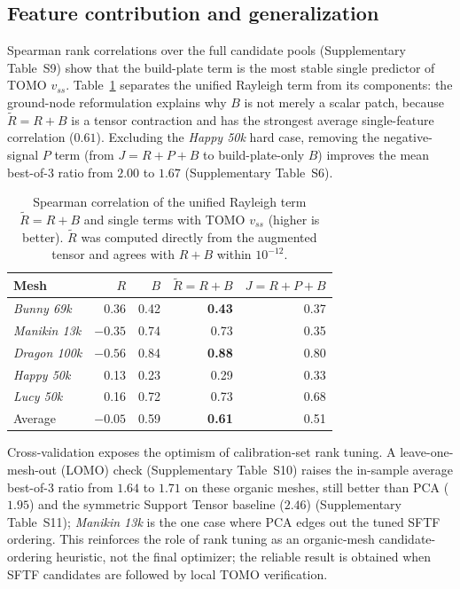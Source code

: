 \documentclass[12pt]{article}
\begin{document}
\subsection{Feature contribution and generalization}
\label{sec:ablation}
Spearman rank correlations over the full candidate pools (Supplementary Table~S9) show
that the build-plate term is the most stable single predictor of TOMO $v_{ss}$.
Table~\ref{tab:unified-corr} separates the unified Rayleigh term from its components:
the ground-node reformulation explains why $B$ is not merely a scalar patch, because
$\tilde R=R+B$ is a tensor contraction and has the strongest average single-feature
correlation ($0.61$). Excluding the \emph{Happy 50k} hard case, removing the
negative-signal $P$ term (from $J=R+P+B$ to build-plate-only $B$) improves the mean
best-of-3 ratio from $2.00$ to $1.67$ (Supplementary Table~S6).

\begin{table}[H]
\centering
\caption{Spearman correlation of the unified Rayleigh term $\tilde R=R+B$ and single
terms with TOMO $v_{ss}$ (higher is better). $\tilde R$ was computed directly from the
augmented tensor and agrees with $R+B$ within $10^{-12}$.}
\label{tab:unified-corr}
\begin{tabular}{lrrrr}
\toprule
Mesh & $R$ & $B$ & $\tilde R=R{+}B$ & $J=R{+}P{+}B$\\
\midrule
\emph{Bunny 69k}   & 0.36 & 0.42 & \textbf{0.43} & 0.37\\
\emph{Manikin 13k} & $-0.35$ & 0.74 & 0.73 & 0.35\\
\emph{Dragon 100k}  & $-0.56$ & 0.84 & \textbf{0.88} & 0.80\\
\emph{Happy 50k}   & 0.13 & 0.23 & 0.29 & 0.33\\
\emph{Lucy 50k}    & 0.16 & 0.72 & 0.73 & 0.68\\
\midrule
Average    & $-0.05$ & 0.59 & \textbf{0.61} & 0.51\\
\bottomrule
\end{tabular}
\end{table}

Cross-validation exposes the optimism of calibration-set rank tuning. A
leave-one-mesh-out (LOMO) check (Supplementary Table~S10) raises the in-sample average
best-of-3 ratio from $1.64$ to $1.71$ on these organic meshes, still better than PCA
($1.95$) and the symmetric Support Tensor baseline ($2.46$) (Supplementary Table~S11);
\emph{Manikin 13k} is the one case where PCA edges out the tuned SFTF ordering. This
reinforces the role of rank tuning as an organic-mesh candidate-ordering heuristic,
not the final optimizer; the reliable result is obtained when SFTF candidates are
followed by local TOMO verification.
\end{document}
